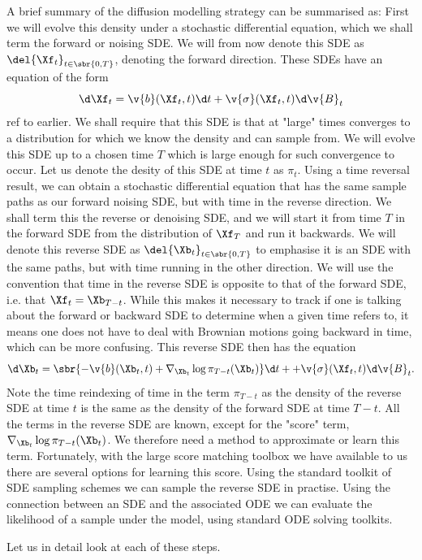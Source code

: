 A brief summary of the diffusion modelling strategy can be summarised as:
\1 First we will evolve this density under a stochastic differential equation, which we shall term the forward or noising SDE.
We will from now denote this SDE as \(\del{\Xf_t}_{t\in\sbr{0, T}}\), denoting the forward direction.
These SDEs have an equation of the form \[\d \Xf_t= \v{b}(\Xf_t, t) \d t + \v{\sigma}(\Xf_t, t) \d \v{B}_t\] ref to earlier.
We shall require that this SDE is that at "large" times converges to a distribution for which we know the density and can sample from.
We will evolve this SDE up to a chosen time \(T\) which is large enough for such convergence to occur.
Let us denote the desity of this SDE at time \(t\) as \(\pi_t\).
\2 Using a time reversal result, we can obtain a stochastic differential equation that has the same sample paths as our forward noising SDE, but with time in the reverse direction.
We shall term this the reverse or denoising SDE, and we will start it from time \(T\) in the forward SDE from the distribution of \(\Xf_T\) and run it backwards.
We will denote this reverse SDE as \(\del{\Xb_t}_{t\in\sbr{0, T}}\) to emphasise it is an SDE with the same paths, but with time running in the other direction.
We will use the convention that time in the reverse SDE is opposite to that of the forward SDE, i.e. that \(\Xf_t = \Xb_{T-t}\).
While this makes it necessary to track if one is talking about the forward or backward SDE to determine when a given time refers to, it means one does not have to deal with Brownian motions going backward in time, which can be more confusing.
This reverse SDE then has the equation \[\d \Xb_t = \sbr{-\v{b}(\Xb_t, t) + \nabla_{\Xb_t} \log \pi_{T-t}(\Xb_t) }\d t + + \v{\sigma}(\Xf_t, t) \d \v{B}_t.\]
Note the time reindexing of time in the term \(\pi_{T-t}\) as the density of the reverse SDE at time \(t\) is the same as the density of the forward SDE at time \(T-t\).
\3 All the terms in the reverse SDE are known, except for the "score" term, \(\nabla_{\Xb_t} \log \pi_{T-t}(\Xb_t)\).
We therefore need a method to approximate or learn this term.
Fortunately, with the large score matching toolbox we have available to us there are several options for learning this score.
\4 Using the standard toolkit of SDE sampling schemes we can sample the reverse SDE in practise.
\5 Using the connection between an SDE and the associated ODE we can evaluate the likelihood of a sample under the model, using standard ODE solving toolkits.
\0

Let us in detail look at each of these steps. 

